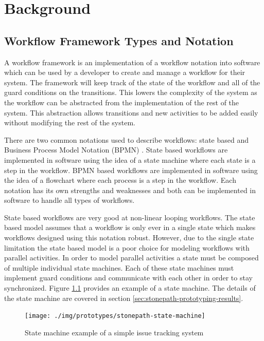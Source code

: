 \documentclass[document.tex]{subfiles}
\begin{document}
\chapter {Background}
\label {ch:background}


\section {Workflow Framework Types and Notation}
\label {sec:overview-of-workflows}

A workflow framework is an implementation of a workflow notation into software which can be used by a developer to create and manage a workflow for their system. The framework will keep track of the state of the workflow and all of the guard conditions on the transitions. This lowers the complexity of the system as the workflow can be abstracted from the implementation of the rest of the system. This abstraction allows transitions and new activities to be added easily without modifying the rest of the system.

There are two common notations used to describe workflows: state based and Business Process Model Notation (BPMN) \cite{bpmn}. State based workflows are implemented in software using the idea of a state machine where each state is a step in the workflow. BPMN based workflows are implemented in software using the idea of a flowchart where each process is a step in the workflow. Each notation has its own strengths and weaknesses and both can be implemented in software to handle all types of workflows.

State based workflows are very good at non-linear looping workflows. The state based model assumes that a workflow is only ever in a single state which makes workflows designed using this notation robust. However, due to the single state limitation the state based model is a poor choice for modeling workflows with parallel activities. In order to model parallel activities a state must be composed of multiple individual state machines. Each of these state machines must implement guard conditions and communicate with each other in order to stay synchronized. Figure \ref{fig:state-machine-example-diagram} provides an example of a state machine. The details of the state machine are covered in section \ref{sec:stonepath-prototyping-results}.

\begin{figure}[!ht]
\centering \texttt{[image: ./img/prototypes/stonepath-state-machine]}
\caption{State machine example of a simple issue tracking system}
\label{fig:state-machine-example-diagram}
\end{figure}
\end{document}

